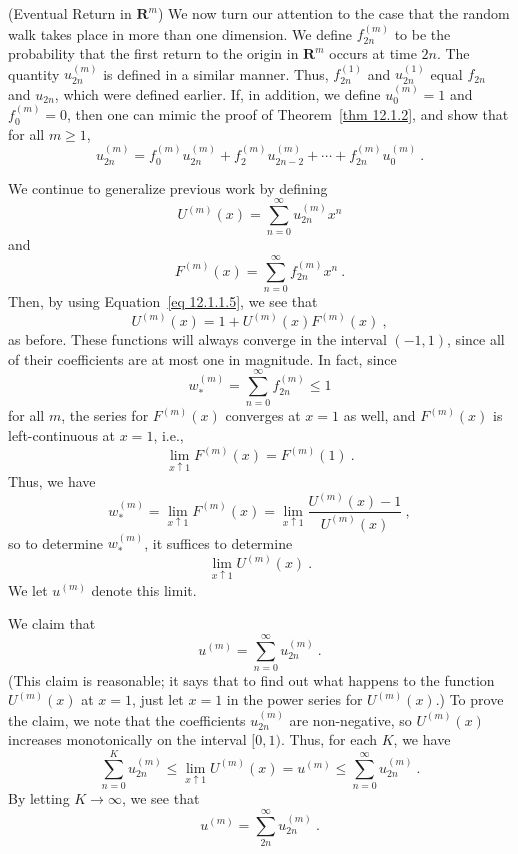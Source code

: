 \begin{example}\label{exam 12.1.0.6}(Eventual Return in ${\mathbf R}^m$)
We now turn our attention to the case that the random walk takes place in more than one dimension.
We define $f^{(m)}_{2n}$ to be the probability that the first return to the origin in ${\mathbf
R}^m$ occurs at time $2n$.  The quantity $u^{(m)}_{2n}$ is defined in a similar manner.  Thus,
$f^{(1)}_{2n}$ and $u^{(1)}_{2n}$ equal $f_{2n}$ and $u_{2n}$, which were defined earlier.  If,
in addition, we define $u^{(m)}_0 = 1$ and $f^{(m)}_0 = 0$, then one can mimic the proof of
Theorem~\ref{thm 12.1.2}, and show that for all $m \ge 1$,
\begin{equation}
u^{(m)}_{2n} = f^{(m)}_0 u^{(m)}_{2n} + f^{(m)}_2 u^{(m)}_{2n-2} + \cdots +
f^{(m)}_{2n}u^{(m)}_0\ .
\label{eq 12.1.1.5}
\end{equation}
\par
We continue to generalize previous work by defining
$$U^{(m)}(x) = \sum_{n = 0}^\infty u^{(m)}_{2n} x^n$$
and
$$F^{(m)}(x) = \sum_{n = 0}^\infty f^{(m)}_{2n} x^n\ .$$
Then, by using Equation~\ref{eq 12.1.1.5}, we see that
$$U^{(m)}(x) = 1 + U^{(m)}(x) F^{(m)}(x)\ ,$$
as before.  These functions will always converge in the interval $(-1, 1)$, since all of their
coefficients are at most one in magnitude.  In fact, since 
$$w^{(m)}_* = \sum_{n = 0}^\infty f^{(m)}_{2n} \le 1$$
for all $m$, the series for $F^{(m)}(x)$ converges at $x = 1$ as well, and $F^{(m)}(x)$ is
left-continuous at $x = 1$, i.e., 
$$\lim_{x \uparrow 1} F^{(m)}(x) = F^{(m)}(1)\ .$$
Thus, we have
\begin{equation}
w^{(m)}_* = \lim_{x \uparrow 1} F^{(m)}(x) = \lim_{x \uparrow 1} 
\frac{U^{(m)}(x) - 1}{U^{(m)}(x)}\ ,
\label{eq 12.1.1.6}
\end{equation}
so to determine $w^{(m)}_*$, it suffices to determine 
$$\lim_{x \uparrow 1} U^{(m)}(x)\ .$$
We let $u^{(m)}$ denote this limit.
\par
We claim that 
$$u^{(m)} = \sum_{n = 0}^\infty u^{(m)}_{2n}\ .$$
(This claim is reasonable; it says that to find out what happens to the function $U^{(m)}(x)$ at
$x = 1$, just let $x = 1$ in the power series for $U^{(m)}(x)$.)  To prove the claim, we note
that the coefficients $u^{(m)}_{2n}$ are non-negative, so $U^{(m)}(x)$ increases monotonically on
the interval $[0, 1)$.  Thus, for each $K$, we have
$$\sum_{n = 0}^K u^{(m)}_{2n} \le \lim_{x \uparrow 1} U^{(m)}(x) = u^{(m)} \le \sum_{n = 0}^\infty
u^{(m)}_{2n}\ .$$
By letting $K \rightarrow \infty$, we see that
$$u^{(m)} = \sum_{2n}^\infty u^{(m)}_{2n}\ .$$

\end{example}
